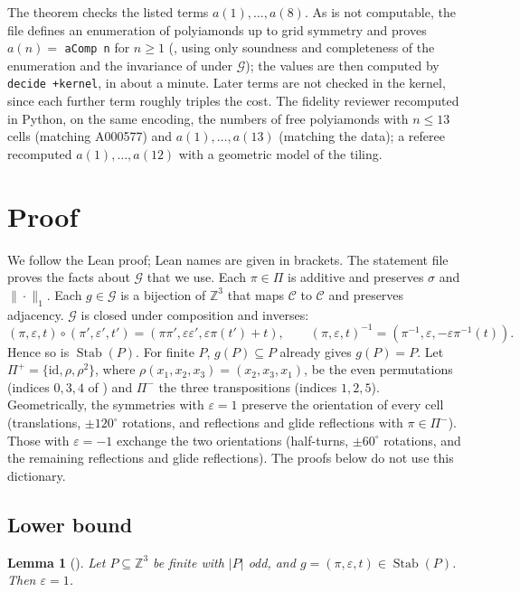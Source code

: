 \documentclass[11pt]{amsart}
\theoremstyle{plain}
\newtheorem{lemma}[theorem]{Lemma}
\theoremstyle{definition}
\newcommand{\Z}{\mathbb{Z}}
\newcommand{\C}{\mathcal{C}}
\newcommand{\G}{\mathcal{G}}
\newcommand{\Stab}{\operatorname{Stab}}
\begin{document}
The theorem  checks the listed terms $a(1),\dots,a(8)$. As  is not computable, the file defines an enumeration  of polyiamonds up to grid symmetry and proves $a(n)=$ \texttt{aComp n} for $n\ge1$ (, using only soundness and completeness of the enumeration and the invariance of  under $\G$); the values are then computed by \texttt{decide +kernel}, in about a minute. Later terms are not checked in the kernel, since each further term roughly triples the cost. The fidelity reviewer recomputed in Python, on the same encoding, the numbers of free polyiamonds with $n\le13$ cells (matching A000577) and $a(1),\dots,a(13)$ (matching the data); a referee recomputed $a(1),\dots,a(12)$ with a geometric model of the tiling.

\section{Proof}\label{sec:proof}

We follow the Lean proof; Lean names are given in brackets. The statement file proves the facts about $\G$ that we use. Each $\pi\in\Pi$ is additive and preserves $\sigma$ and $\|\cdot\|_1$. Each $g\in\G$ is a bijection of $\Z^3$ that maps $\C$ to $\C$ and preserves adjacency. $\G$ is closed under composition and inverses:
\[
  (\pi,\varepsilon,t)\circ(\pi',\varepsilon',t')=(\pi\pi',\varepsilon\varepsilon',\varepsilon\pi(t')+t),\qquad (\pi,\varepsilon,t)^{-1}=(\pi^{-1},\varepsilon,-\varepsilon\pi^{-1}(t)).
\]
Hence so is $\Stab(P)$. For finite $P$, $g(P)\subseteq P$ already gives $g(P)=P$. Let $\Pi^+=\{\mathrm{id},\rho,\rho^2\}$, where $\rho(x_1,x_2,x_3)=(x_2,x_3,x_1)$, be the even permutations (indices $0,3,4$ of ) and $\Pi^-$ the three transpositions (indices $1,2,5$). Geometrically, the symmetries with $\varepsilon=1$ preserve the orientation of every cell (translations, $\pm120^\circ$ rotations, and reflections and glide reflections with $\pi\in\Pi^-$). Those with $\varepsilon=-1$ exchange the two orientations (half-turns, $\pm60^\circ$ rotations, and the remaining reflections and glide reflections). The proofs below do not use this dictionary.

\subsection{Lower bound}

\begin{lemma}[]\label{lem:neg}
Let $P\subseteq\Z^3$ be finite with $|P|$ odd, and $g=(\pi,\varepsilon,t)\in\Stab(P)$. Then $\varepsilon=1$.
\end{lemma}
\end{document}
